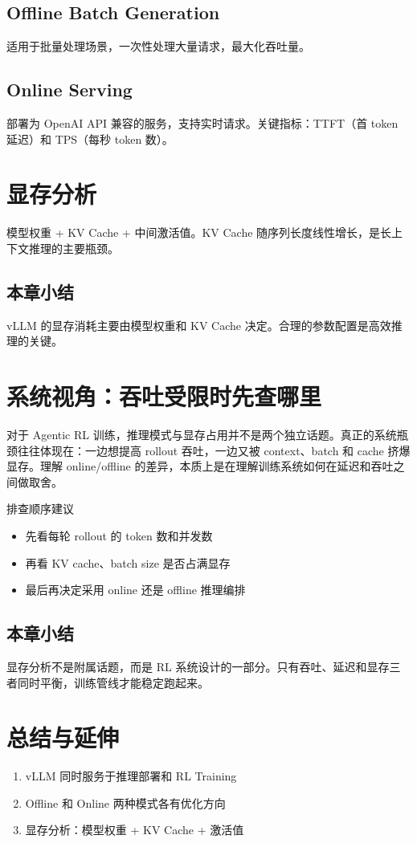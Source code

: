 \documentclass[a4paper]{article}
\begin{document}
\subsection{Offline Batch Generation}
适用于批量处理场景，一次性处理大量请求，最大化吞吐量。

\subsection{Online Serving}
部署为 OpenAI API 兼容的服务，支持实时请求。关键指标：TTFT（首 token 延迟）和 TPS（每秒 token 数）。

\section{显存分析}
模型权重 + KV Cache + 中间激活值。KV Cache 随序列长度线性增长，是长上下文推理的主要瓶颈。

\subsection{本章小结}
vLLM 的显存消耗主要由模型权重和 KV Cache 决定。合理的参数配置是高效推理的关键。

\section{系统视角：吞吐受限时先查哪里}
对于 Agentic RL 训练，推理模式与显存占用并不是两个独立话题。真正的系统瓶颈往往体现在：一边想提高 rollout 吞吐，一边又被 context、batch 和 cache 挤爆显存。理解 online/offline 的差异，本质上是在理解训练系统如何在延迟和吞吐之间做取舍。

\begin{knowledgebox}{排查顺序建议}
\begin{itemize}
  \item 先看每轮 rollout 的 token 数和并发数
  \item 再看 KV cache、batch size 是否占满显存
  \item 最后再决定采用 online 还是 offline 推理编排
\end{itemize}
\end{knowledgebox}

\subsection{本章小结}
显存分析不是附属话题，而是 RL 系统设计的一部分。只有吞吐、延迟和显存三者同时平衡，训练管线才能稳定跑起来。

\newpage
\section{总结与延伸}
\begin{enumerate}
  \item vLLM 同时服务于推理部署和 RL Training
  \item Offline 和 Online 两种模式各有优化方向
  \item 显存分析：模型权重 + KV Cache + 激活值
\end{enumerate}
\end{document}
